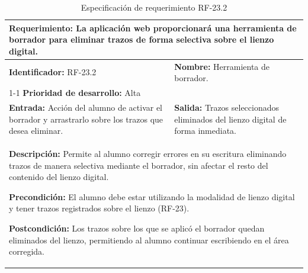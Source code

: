 \begin{table}[H]
\caption{Especificación de requerimiento RF-23.2}
\centering
\renewcommand{\arraystretch}{1.3}
\setlength{\tabcolsep}{6pt}
\begin{tabular}{|p{7cm}|p{8cm}|}
\hline
\multicolumn{2}{|p{15cm}|}{\textbf{Requerimiento:} La aplicación web proporcionará una herramienta de borrador para eliminar trazos de forma selectiva sobre el lienzo digital.} \\ \hline
\textbf{Identificador:} RF-23.2 &
\textbf{Nombre:} Herramienta de borrador. \\ \cline{1-1}
\textbf{Prioridad de desarrollo:} Alta &
\multicolumn{1}{p{8cm}|}{} \\ \hline
\textbf{Entrada:} Acción del alumno de activar el borrador y arrastrarlo sobre los trazos que desea eliminar. &
\textbf{Salida:} Trazos seleccionados eliminados del lienzo digital de forma inmediata. \\ \hline
\multicolumn{2}{|p{15cm}|}{
\textbf{Descripción:} Permite al alumno corregir errores en su escritura eliminando trazos de manera selectiva mediante el borrador, sin afectar el resto del contenido del lienzo digital.

\vspace{0.2cm}
\textbf{Precondición:} El alumno debe estar utilizando la modalidad de lienzo digital y tener trazos registrados sobre el lienzo (RF-23).

\vspace{0.2cm}
\textbf{Postcondición:} Los trazos sobre los que se aplicó el borrador quedan eliminados del lienzo, permitiendo al alumno continuar escribiendo en el área corregida.
} \\ \hline
\end{tabular}
\label{tab:rf23_2}
\end{table}

